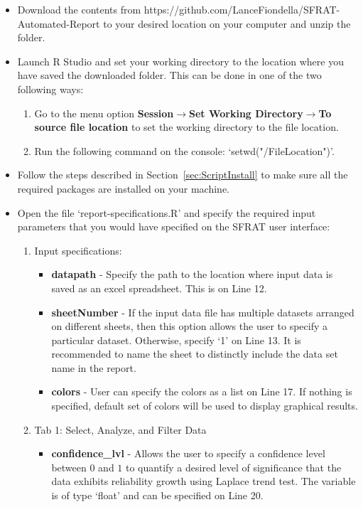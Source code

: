 \documentclass[journal]{IEEEtran}
\begin{document}
\begin{itemize}
  \item {Download the contents from https://github.com/LanceFiondella/SFRAT-Automated-Report to your desired location on your computer and unzip the folder.}
  \item {Launch R Studio and set your working directory to the location where you have saved the downloaded folder. This can be done in one of the two following ways:
  \begin{enumerate}
    \item {Go to the menu option \textbf{Session}$\to$\textbf{Set Working Directory}$\to$\textbf{To source file location} to set the working directory to the file location.}
    \item {Run the following command on the console: `setwd("/FileLocation")'.}
  \end{enumerate}
  }
  \item {Follow the steps described in Section~\ref{sec:ScriptInstall} to make sure all the required packages are installed on your machine.}
  \item {Open the file `report-specifications.R’ and specify the required input parameters that you would have specified on the SFRAT user interface:
  \begin{enumerate}
    \item {Input specifications: 
    \begin{itemize}
      \item {\textbf{datapath} - Specify the path to the location where input data is saved as an excel spreadsheet. This is on Line 12.}
      \item {\textbf{sheetNumber} - If the input data file has multiple datasets arranged on different sheets, then this option allows the user to specify a particular dataset. Otherwise, specify `1' on Line 13. It is recommended to name the sheet to distinctly include the data set name in the report.}
      \item {\textbf{colors} - User can specify the colors as a list on Line 17. If nothing is specified, default set of colors will be used to display graphical results.}
    \end{itemize}
  }
    \item {Tab 1: Select, Analyze, and Filter Data
    \begin{itemize}
    \item{\textbf{confidence\_lvl} - Allows the user to specify a confidence level between $0$ and $1$ to quantify  a desired level of significance that the data exhibits reliability growth using Laplace trend test. The variable is of type `float' and can be specified on Line 20.}

\end{itemize}}
\end{enumerate}}
\end{itemize}
\end{document}

